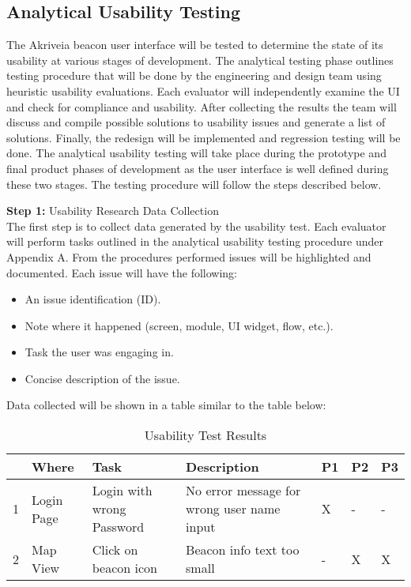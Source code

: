 

\subsection{Analytical Usability Testing}
\bigskip
The Akriveia beacon user interface will be tested to determine the state of its usability at various stages of development. The analytical testing phase outlines testing procedure that will be done by the engineering and design team using heuristic usability evaluations. Each evaluator will independently examine the UI and check for compliance and usability. After collecting the results the team will discuss and compile possible solutions to usability issues and generate a list of solutions. Finally, the redesign will be implemented and regression testing will be done. The analytical usability testing will take place during the prototype and final product phases of development as the user interface is well defined during these two stages. The testing procedure will follow the steps described below.

\bigskip



\textbf{Step 1:} Usability Research Data Collection\\
\medskip
The first step is to collect data generated by the usability test. Each evaluator will perform tasks outlined in the analytical usability testing procedure under Appendix A. From the procedures performed issues will be highlighted and documented. Each issue will have the following:
\begin{itemize}
\setlength\itemsep{0.1mm}
	\item An issue identification (ID).
	\item Note where it happened (screen, module, UI widget, flow, etc.).
	\item Task the user was engaging in.
	\item Concise description of the issue.
\end{itemize}
Data collected will be shown in a table similar to the table below:

\def\arraystretch{1.5}
\begin{table}[H]
\centering
\begin{tabular}{ | p{0.5cm} | p{2cm}| p{5cm} | p{5cm} | p{0.5cm} | p{0.5cm} | p{0.5cm}|} 
\hline

\rowcolor{lightgray} \multicolumn{1}{|l|}{\textbf{ID}} & \textbf{Where} & \textbf{Task} &  \textbf{Description} & \textbf{P1} & \textbf{P2} & \textbf{P3} \\ 
\hline
1 & Login Page & Login with wrong Password & No error message for wrong user name input & X & - & - \\
\hline
2 & Map View & Click on beacon icon & Beacon info text too small & - & X & X \\
\hline
\end{tabular}
\caption{Usability Test Results}
\end{table}	



